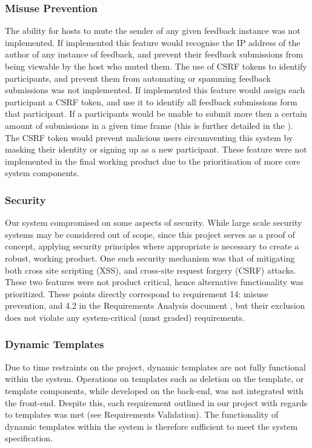\documentclass[9pt, titlepage]{extarticle}
\begin{document}
\subsubsection{Misuse Prevention}

The ability for hosts to mute the sender of any given feedback instance was not implemented. If implemented this feature would recognise the IP address of the author of any instance of feedback, and prevent their feedback submissions from being viewable by the host who muted them. The use of CSRF tokens \cite{owasp-csrf} to identify participants, and prevent them from automating or spamming feedback submissions was not implemented. If implemented this feature would assign each participant a CSRF token, and use it to identify all feedback submissions form that participant. If a participants would be unable to submit more then a certain amount of submissions in a given time frame (this is further detailed in the \cite{design document}). The CSRF token would prevent malicious users circumventing this system by masking their identity or signing up as a new participant. These feature were not implemented in the final working product due to the prioritisation of more core system components.%

\subsubsection{Security}

Our system compromised on some aspects of security. While large scale security systems may be considered out of scope, since this project serves as a proof of concept, applying security principles where appropriate is necessary to create a robust, working product. One such security mechanism was that of mitigating both cross site scripting (XSS), and cross-site request forgery (CSRF) attacks. These two features were not product critical, hence alternative functionality was prioritized. These points directly correspond to requirement 14: misuse prevention, and 4.2 in the Requirements Analysis document \cite{requirements-analysis}, but their exclusion does not violate any system-critical (must graded) requirements.

\subsubsection{Dynamic Templates}

Due to time restraints on the project, dynamic templates are not fully functional within the system. Operations on templates such as deletion on the template, or template components, while developed on the back-end, was not integrated with the front-end. Despite this, each requirement outlined in our project with regards to templates was met (see Requirements Validation). The functionality of dynamic templates within the system is therefore sufficient to meet the system specification.
\end{document}
